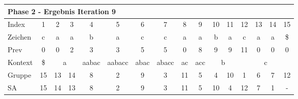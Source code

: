 \begin{table}[H]
\centering
\begin{adjustbox}{max width=\textwidth}
\centering
\begin{tabular}{lccccccccccccccc}
\multicolumn{16}{l}{Phase 2 - Ergebnis Iteration 9}                                                                                                                                                                                                                                                                                                                \\ \hline
\multicolumn{1}{l|}{Index}   & 1                       & 2  & 3                       & 4                          & 5                           & 6                         & 7                          & 8                       & 9                                              & 10 & 11                                             & 12  & 13  & 14  & 15  \\
\multicolumn{1}{l|}{Zeichen} & c                       & a  & a                       & b                          & a                           & c                         & c                          & a                       & a                                              & b  & a                                              & c   & a   & a   & \$  \\
\multicolumn{1}{l|}{Prev}    & 0                       & 0  & 2                       & 3                          & 3                           & 5                         & 5                          & 0                       & 8                                              & 9  & 9                                              & 11  & 0   & 0   & 0   \\ \hline
\multicolumn{1}{l|}{Kontext} & \multicolumn{1}{c|}{\$} & \multicolumn{2}{c|}{a}       & \multicolumn{1}{c|}{aabac} & \multicolumn{1}{c|}{aabacc} & \multicolumn{1}{c|}{abac} & \multicolumn{1}{c|}{abacc} & \multicolumn{1}{c|}{ac} & \multicolumn{1}{c|}{acc}                       & \multicolumn{2}{c|}{b}                              & \multicolumn{4}{c}{c} \\
\multicolumn{1}{l|}{Gruppe}  & \multicolumn{1}{c|}{15} & 13 & \multicolumn{1}{c|}{14} & \multicolumn{1}{c|}{8}     & \multicolumn{1}{c|}{2}      & \multicolumn{1}{c|}{9}    & \multicolumn{1}{c|}{3}     & \multicolumn{1}{c|}{11} & \multicolumn{1}{c|}{5}                         & 4  & \multicolumn{1}{c|}{10}                        & 1   & 6   & 7   & 12  \\
\multicolumn{1}{l|}{SA}      & \multicolumn{1}{c|}{15} & 14 & \multicolumn{1}{c|}{13} & \multicolumn{1}{c|}{8}     & \multicolumn{1}{c|}{2}      & \multicolumn{1}{c|}{9}    & \multicolumn{1}{c|}{3}     & \multicolumn{1}{c|}{11} & \multicolumn{1}{c|}{\cellcolor[HTML]{\green}5} & 10 & \multicolumn{1}{c|}{\cellcolor[HTML]{\red}4} & 12  & 7   & 1   & -  
\end{tabular}
\end{adjustbox}


\end{table}
